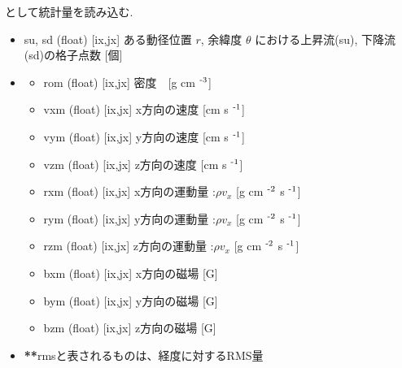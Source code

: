 \documentclass[letterpaper,10pt,dvipdfmx,report]{sphinxmanual}
\begin{document}
\sphinxAtStartPar
として統計量を読み込む.
\begin{itemize}
\item {} 
\sphinxAtStartPar
su, sd (float) {[}ix,jx{]} \sphinxhyphen{}\sphinxhyphen{} ある動径位置 \(r\), 余緯度 \(\theta\) における上昇流(su), 下降流(sd)の格子点数 {[}個{]}

\item {} \begin{description}
\begin{itemize}
\item {} 
\sphinxAtStartPar
rom (float) {[}ix,jx{]} \sphinxhyphen{}\sphinxhyphen{} 密度　{[}g cm $^{\text{\mbox{-}3}}${]}

\item {} 
\sphinxAtStartPar
vxm (float) {[}ix,jx{]} \sphinxhyphen{}\sphinxhyphen{} x方向の速度 {[}cm s $^{\text{\mbox{-}1}}${]}

\item {} 
\sphinxAtStartPar
vym (float) {[}ix,jx{]} \sphinxhyphen{}\sphinxhyphen{} y方向の速度 {[}cm s $^{\text{\mbox{-}1}}${]}

\item {} 
\sphinxAtStartPar
vzm (float) {[}ix,jx{]} \sphinxhyphen{}\sphinxhyphen{} z方向の速度 {[}cm s $^{\text{\mbox{-}1}}${]}

\item {} 
\sphinxAtStartPar
rxm (float) {[}ix,jx{]} \sphinxhyphen{}\sphinxhyphen{} x方向の運動量 :\(\rho v_x\)  {[}g cm $^{\text{\mbox{-}2}}$ s $^{\text{\mbox{-}1}}${]}

\item {} 
\sphinxAtStartPar
rym (float) {[}ix,jx{]} \sphinxhyphen{}\sphinxhyphen{} y方向の運動量 :\(\rho v_x\)  {[}g cm $^{\text{\mbox{-}2}}$ s $^{\text{\mbox{-}1}}${]}

\item {} 
\sphinxAtStartPar
rzm (float) {[}ix,jx{]} \sphinxhyphen{}\sphinxhyphen{} z方向の運動量 :\(\rho v_x\)  {[}g cm $^{\text{\mbox{-}2}}$ s $^{\text{\mbox{-}1}}${]}

\item {} 
\sphinxAtStartPar
bxm (float) {[}ix,jx{]} \sphinxhyphen{}\sphinxhyphen{} x方向の磁場 {[}G{]}

\item {} 
\sphinxAtStartPar
bym (float) {[}ix,jx{]} \sphinxhyphen{}\sphinxhyphen{} y方向の磁場 {[}G{]}

\item {} 
\sphinxAtStartPar
bzm (float) {[}ix,jx{]} \sphinxhyphen{}\sphinxhyphen{} z方向の磁場 {[}G{]}

\end{itemize}

\end{description}

\item {} 
\sphinxAtStartPar
{\color{red}\bfseries{}\textasciigrave{}}{\color{red}\bfseries{}**}rms\textasciigrave{}と表されるものは、経度に対するRMS量

\end{itemize}
\end{document}
